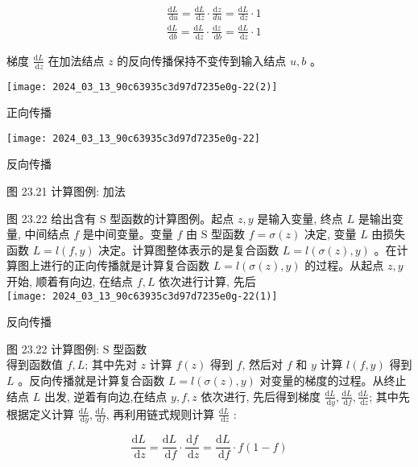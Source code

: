 \documentclass[10pt]{article}
\begin{document}
\begin{CJK*}{UTF8}{bsmi}
$$
\begin{aligned}
& \frac{\mathrm{d} L}{\mathrm{~d} u}=\frac{\mathrm{d} L}{\mathrm{~d} z} \cdot \frac{\mathrm{d} z}{d u}=\frac{\mathrm{d} L}{\mathrm{~d} z} \cdot 1 \\
& \frac{\mathrm{d} L}{\mathrm{~d} b}=\frac{\mathrm{d} L}{\mathrm{~d} z} \cdot \frac{\mathrm{d} z}{\mathrm{~d} b}=\frac{\mathrm{d} L}{\mathrm{~d} z} \cdot 1
\end{aligned}
$$

梯度 $\frac{\mathrm{d} L}{\mathrm{~d} z}$ 在加法结点 $z$ 的反向传播保持不变传到输入结点 $u, b$ 。

\begin{center}
\texttt{[image: 2024\_03\_13\_90c63935c3d97d7235e0g-22(2)]}
\end{center}

正向传播

\begin{center}
\texttt{[image: 2024\_03\_13\_90c63935c3d97d7235e0g-22]}
\end{center}

反向传播

图 23.21 计算图例: 加法

图 23.22 给出含有 $\mathrm{S}$ 型函数的计算图例。起点 $z, y$ 是输入变量, 终点 $L$ 是输出变量, 中间结点 $f$ 是中间变量。变量 $f$ 由 $\mathrm{S}$ 型函数 $f=\sigma(z)$ 决定, 变量 $L$ 由损失函数 $L=l(f, y)$ 决定。计算图整体表示的是复合函数 $L=l(\sigma(z), y)$ 。在计算图上进行的正向传播就是计算复合函数 $L=l(\sigma(z), y)$ 的过程。从起点 $z, y$ 开始, 顺着有向边, 在结点 $f, L$ 依次进行计算, 先后\\
\texttt{[image: 2024\_03\_13\_90c63935c3d97d7235e0g-22(1)]}

反向传播

图 23.22 计算图例: $\mathrm{S}$ 型函数\\
得到函数值 $f, L$; 其中先对 $z$ 计算 $f(z)$ 得到 $f$, 然后对 $f$ 和 $y$ 计算 $l(f, y)$ 得到 $L$ 。反向传播就是计算复合函数 $L=l(\sigma(z), y)$ 对变量的梯度的过程。从终止结点 $L$ 出发, 逆着有向边,在结点 $y, f, z$ 依次进行, 先后得到梯度 $\frac{\mathrm{d} L}{\mathrm{~d} y}, \frac{\mathrm{d} L}{\mathrm{~d} f}, \frac{\mathrm{d} L}{\mathrm{~d} z}$; 其中先根据定义计算 $\frac{\mathrm{d} L}{\mathrm{~d} y}, \frac{\mathrm{d} L}{\mathrm{~d} f}$, 再利用链式规则计算 $\frac{\mathrm{d} L}{\mathrm{~d} z}$ :

$$
\frac{\mathrm{d} L}{\mathrm{~d} z}=\frac{\mathrm{d} L}{\mathrm{~d} f} \cdot \frac{\mathrm{d} f}{\mathrm{~d} z}=\frac{\mathrm{d} L}{\mathrm{~d} f} \cdot f(1-f)
$$


\end{CJK*}
\end{document}
